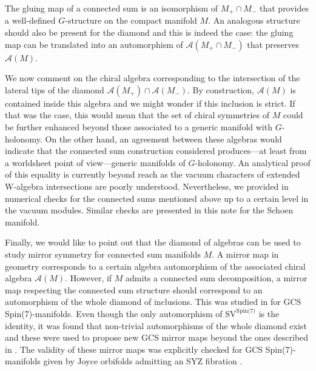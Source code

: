\documentclass{pspum-l}
\newcommand{\SVeight}{\text{SV}^\text{Spin(7)}}
\theoremstyle{definition}
\theoremstyle{remark}
\numberwithin{equation}{section}
\begin{document}
The gluing map of a connected sum is an isomorphism of $M_+\cap M_-$ that provides a well-defined $G$-structure on the compact manifold $M$. An analogous structure should also be present for the diamond and this is indeed the case: the gluing map can be translated into an automorphism of $\mathcal{A}(M_+\cap M_-)$ that preserves $\mathcal{A}(M)$.

We now comment on the chiral algebra corresponding to the intersection of the lateral tips of the diamond $\mathcal{A}(M_+)\cap\mathcal{A}(M_-)$. By construction, $\mathcal{A}(M)$ is contained inside this algebra and we might wonder if this inclusion is strict. If that was the case, this would mean that the set of chiral symmetries of $M$ could be further enhanced beyond those associated to a generic manifold with $G$-holonomy. On the other hand, an agreement between these algebras would indicate that the connected sum construction considered produces---at least from a worldsheet point of view---generic manifolds of $G$-holonomy. An analytical proof of this equality is currently beyond reach as the vacuum characters of extended W-algebra intersections are poorly understood. Nevertheless, we provided in \cite{Fiset:2021ruv} numerical checks for the connected sums mentioned above up to a certain level in the vacuum modules. Similar checks are presented in this note for the Schoen manifold.

Finally, we would like to point out that the diamond of algebras can be used to study mirror symmetry for connected sum manifolds $M$. A mirror map in geometry corresponds to a certain algebra automorphism of the associated chiral algebra $\mathcal{A}(M)$. However, if $M$ admits a connected sum decomposition, a mirror map respecting the connected sum structure should correspond to an automorphism of the whole diamond of inclusions. This was studied in \cite{Fiset:2021ruv} for GCS Spin(7)-manifolds. Even though the only automorphism of $\SVeight$ is the identity, it was found that non-trivial automorphisms of the whole diamond exist and these were used to propose new GCS mirror maps beyond the ones described in \cite{Braun:2019lnn}. The validity of these mirror maps was explicitly checked for GCS Spin(7)-manifolds given by Joyce orbifolds \cite{Joyce:1996} admitting an SYZ fibration \cite{Strominger:1996it}.
\end{document}
